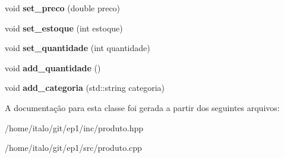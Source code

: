 \begin{DoxyCompactItemize}
void {\bfseries set\+\_\+preco} (double preco)
\item 
\mbox{\label{class_produto_a597a7fbdfb12ac5dd160c62d315f113b}} 
void {\bfseries set\+\_\+estoque} (int estoque)
\item 
\mbox{\label{class_produto_a7236d29a461f9d28f1dc402b98a8e4af}} 
void {\bfseries set\+\_\+quantidade} (int quantidade)
\item 
\mbox{\label{class_produto_a36a43c3b4cffdf436e02c807e038da81}} 
void {\bfseries add\+\_\+quantidade} ()
\item 
\mbox{\label{class_produto_a38d3c34151f2794702862c9bcf2b6de5}} 
void {\bfseries add\+\_\+categoria} (std\+::string categoria)
\end{DoxyCompactItemize}


A documentação para esta classe foi gerada a partir dos seguintes arquivos\+:\begin{DoxyCompactItemize}
\item 
/home/italo/git/ep1/inc/produto.\+hpp\item 
/home/italo/git/ep1/src/produto.\+cpp\end{DoxyCompactItemize}
